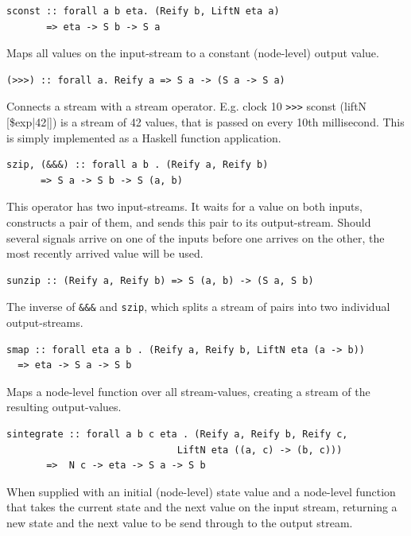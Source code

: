 \documentclass[a4paper, oneside, final]{memoir}
\begin{document}
\begin{description}
\item
\begin{verbatim}
sconst :: forall a b eta. (Reify b, LiftN eta a)
       => eta -> S b -> S a
\end{verbatim}
     Maps all values on the input-stream to a constant (node-level) output value.

\item
\begin{verbatim}
(>>>) :: forall a. Reify a => S a -> (S a -> S a)
\end{verbatim}
  Connects a stream with a stream operator.  E.g. {\ttfamily clock 10 \verb|>>>|
    sconst (liftN [\$exp|42|])} is a stream of 42 values, that is passed on
  every 10th millisecond. This is simply implemented as a Haskell function
  application.


\item 
\label{item:szip}
\begin{verbatim}
szip, (&&&) :: forall a b . (Reify a, Reify b)
      => S a -> S b -> S (a, b)
\end{verbatim}
  This operator has two input-streams. It waits for a value on both
  inputs, constructs a pair of them, and sends this pair to its
  output-stream.  Should several signals arrive on one of the inputs
  before one arrives on the other, the most recently arrived value
  will be used.

\item 
\begin{verbatim}
sunzip :: (Reify a, Reify b) => S (a, b) -> (S a, S b)
\end{verbatim}
  The inverse of \texttt{\&\&\&} and \texttt{szip}, which splits a
  stream of pairs into two individual output-streams.

\item 
\begin{verbatim}
smap :: forall eta a b . (Reify a, Reify b, LiftN eta (a -> b))
  => eta -> S a -> S b
\end{verbatim}
  Maps a node-level function over all stream-values, creating a stream
  of the resulting output-values.

\item
\begin{verbatim}
sintegrate :: forall a b c eta . (Reify a, Reify b, Reify c,
                              LiftN eta ((a, c) -> (b, c)))
       =>  N c -> eta -> S a -> S b
\end{verbatim}
  When supplied with an initial (node-level) state value and a
  node-level function that takes the current state and the next value
  on the input stream, returning a new state and the next value to be
  send through to the output stream.


\end{description}
\end{document}
